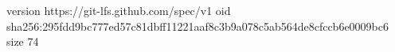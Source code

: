 version https://git-lfs.github.com/spec/v1
oid sha256:295fdd9bc777ed57c81dbff11221aaf8c3b9a078c5ab564de8cfccb6e0009bc6
size 74
